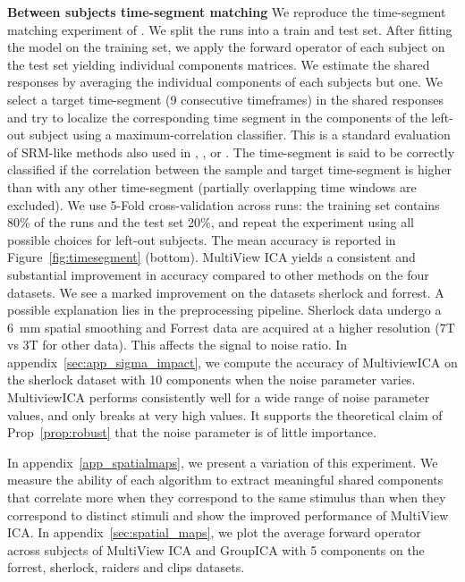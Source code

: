 \textbf{Between subjects time-segment matching} 
We reproduce the time-segment matching experiment of
\cite{chen2015reduced}. 
We split the runs into a train and test set. After fitting the model on the training set, we apply the forward operator of each subject on the test set yielding individual components matrices. We estimate the shared responses by averaging the individual components of each subjects but one.  We select a target time-segment (9 consecutive timeframes) in the shared responses and try to localize the corresponding time segment in the components of the left-out subject using a maximum-correlation classifier.
This is a standard evaluation of SRM-like methods also used in  \cite{chen2015reduced}, \cite{guntupalli2018computational}, \cite{Nastase741975} or
\cite{zhang2016searchlight}.
%
The time-segment is said to be
correctly classified if the correlation between the sample and target
time-segment is higher than with any other time-segment (partially overlapping time windows are excluded).
%
We use 5-Fold cross-validation across runs: the training set contains 80\% of the runs and the test set 20\%, and repeat the experiment using all possible choices for left-out subjects. 
%
The mean accuracy is reported in Figure~\ref{fig:timesegment} (bottom). 
%
MultiView ICA yields a consistent and substantial improvement in accuracy compared to other methods on the four datasets. We see a marked improvement on the datasets sherlock and forrest. A possible explanation lies in the preprocessing pipeline. Sherlock data undergo a 6~mm spatial smoothing and Forrest data are acquired at a higher resolution (7T vs 3T for other data). This affects the signal to noise ratio.
%
In appendix~\ref{sec:app_sigma_impact}, we compute the accuracy of MultiviewICA on the sherlock dataset with 10 components when the noise parameter varies. MultiviewICA performs consistently well for a wide range of noise parameter values, and only breaks at very high values. It supports the theoretical claim of Prop~\ref{prop:robust} that the noise parameter is of little importance.

In appendix~\ref{app_spatialmaps}, we present a variation of this experiment.  We measure the ability of each algorithm to extract meaningful shared components that correlate more when they correspond to the same stimulus than when they correspond to distinct stimuli and show the improved performance of MultiView ICA. 
%
In appendix~\ref{sec:spatial_maps}, we plot the average forward operator across subjects of MultiView ICA and GroupICA with 5 components on the forrest, sherlock, raiders and clips datasets.

